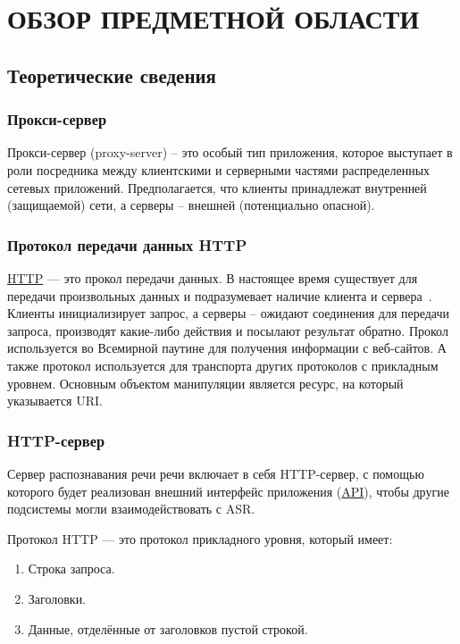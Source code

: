 
\chapter{ОБЗОР ПРЕДМЕТНОЙ ОБЛАСТИ}

\section{Теоретические сведения}

\subsection{Прокси-сервер}
Прокси-сервер (proxy-server) – это особый тип приложения, которое
выступает в роли посредника между клиентскими и серверными частями
распределенных сетевых приложений. Предполагается, что клиенты принадлежат
внутренней (защищаемой) сети, а серверы – внешней (потенциально опасной).

\subsection{Протокол передачи данных HTTP}
\hyperlink{http}{HTTP} --- это прокол передачи данных. В настоящее время существует для передачи
произвольных данных и подразумевает наличие клиента и сервера~\cite{http}.
Клиенты инициализирует запрос, а серверы – ожидают соединения для передачи
запроса, производят какие-либо действия и посылают результат обратно. Прокол
используется во Всемирной паутине для получения информации с веб-сайтов. А
также протокол используется для транспорта других протоколов с прикладным
уровнем. Основным объектом манипуляции является ресурс, на который указывается URI.

\subsection{HTTP-сервер}
Сервер распознавания речи речи включает в себя HTTP-сервер, с помощью которого
будет реализован внешний интерфейс приложения (\hyperlink{api}{API}), чтобы другие
подсистемы могли взаимодействовать с ASR.

Протокол HTTP --- это протокол прикладного уровня, который имеет:
\begin{enumerate}
    \item Строка запроса.
    \item Заголовки.
    \item Данные, отделённые от заголовков пустой строкой.
\end{enumerate}

